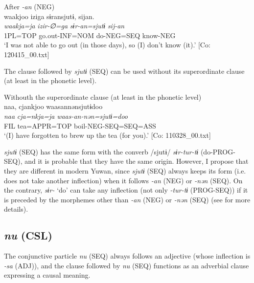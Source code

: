 \begin{xlist}
\ea\label{ex:10.35}   After \textit{{}-an} (NEG)\\
      \glll    waakjoo  iziga  sɨransjutɨ,  sijan.\\
    \textit{waakja=ja}  \textit{izir-∅=ga}  \textit{sɨr-an=sjutɨ}  \textit{sij-an}\\
    1PL=TOP  go.out-INF=NOM  do-NEG=SEQ  know-NEG\\
\glt     ‘I was not able to go out (in those days), so (I) don’t know (it).’  [Co: 120415\_00.txt]
\z

  The clause followed by \textit{sjutɨ} (SEQ) can be used without its superordinate clause (at least in the phonetic level).

\ea\label{ex:10.36}   Withouth the superordinate clause (at least in the phonetic level)\\
      \glll    naa,  cjankjoo  waasannənsjutɨdoo\\
    \textit{naa}  \textit{cja=nkja=ja}  \textit{waas-an-nən=sjutɨ=doo}\\
    FIL  tea=APPR=TOP  boil-NEG-SEQ=SEQ=ASS\\
\glt     ‘(I) have forgotten to brew up the tea (for you).’  [Co: 110328\_00.txt]
\z

  \textit{sjutɨ} (SEQ) has the same form with the converb /sjutɨ/ \textit{sɨr-tur-tɨ} (do-PROG-SEQ), and it is probable that they have the same origin. However, I propose that they are different in modern Yuwan, since \textit{sjutɨ} (SEQ) always keeps its form (i.e. does not take another inflection) when it follows \textit{{}-an} (NEG) or \textit{{}-nən} (SEQ). On the contrary, \textit{sɨr-} ‘do’ can take any inflection (not only \textit{{}-tur-tɨ} (PROG-SEQ)) if it is preceded by the morphemes other than \textit{{}-an} (NEG) or \textit{{}-nən} (SEQ) (see  for more details).

\subsection{\textit{nu} (CSL)}\label{sec:10.2.5}

The conjunctive particle \textit{nu} (SEQ) always follows an adjective (whose inflection is \textit{{}-sa} (ADJ)), and the clause followed by \textit{nu} (SEQ) functions as an adverbial clause expressing a causal meaning.


\end{xlist}
